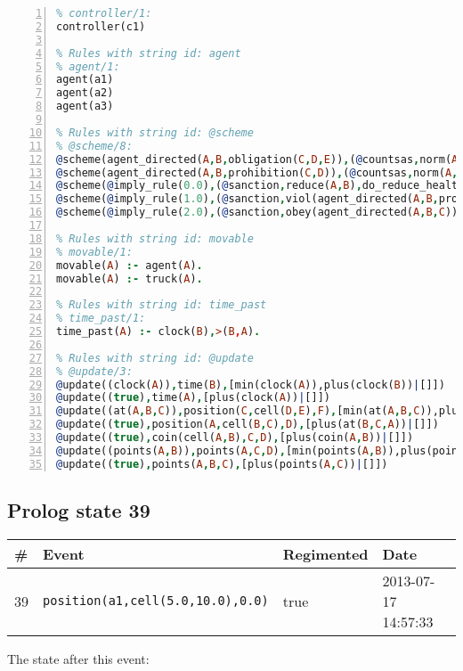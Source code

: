 \documentclass[11pt]{article}\usepackage[utf8]{inputenc}\usepackage{geometry}
\begin{document}
\begin{lstlisting}[language=Prolog, numbers=left]
% Rules with string id: controller
% controller/1:
controller(c1)

% Rules with string id: agent
% agent/1:
agent(a1)
agent(a2)
agent(a3)

% Rules with string id: @scheme
% @scheme/8:
@scheme(agent_directed(A,B,obligation(C,D,E)),(@countsas,norm(A,B,F,obligation(C,D,E)),F),false,(listTrue(C)),(time_past(D)),false,[plus(viol(agent_directed(A,B,obligation(C,D,E))))|[]],[plus(obey(agent_directed(A,B,obligation(C,D,E))))|[]])
@scheme(agent_directed(A,B,prohibition(C,D)),(@countsas,norm(A,B,E,prohibition(C,D)),E),(listTrue(C)),false,(false),false,[plus(viol(agent_directed(A,B,prohibition(C,D))))|[]],[plus(obey(agent_directed(A,B,prohibition(C,D))))|[]])
@scheme(@imply_rule(0.0),(@sanction,reduce(A,B),do_reduce_health(A,B),notifyAgent(A,changed(status))),true,false,false,false,[min(reduce(A,B))|[]],[])
@scheme(@imply_rule(1.0),(@sanction,viol(agent_directed(A,B,prohibition(C,D))),do_sanction(D)),true,false,false,false,[min(viol(agent_directed(A,B,prohibition(C,D))))|[]],[])
@scheme(@imply_rule(2.0),(@sanction,obey(agent_directed(A,B,C))),true,false,false,false,[min(obey(agent_directed(A,B,C)))|[]],[])

% Rules with string id: movable
% movable/1:
movable(A) :- agent(A).
movable(A) :- truck(A).

% Rules with string id: time_past
% time_past/1:
time_past(A) :- clock(B),>(B,A).

% Rules with string id: @update
% @update/3:
@update((clock(A)),time(B),[min(clock(A)),plus(clock(B))|[]])
@update((true),time(A),[plus(clock(A))|[]])
@update((at(A,B,C)),position(C,cell(D,E),F),[min(at(A,B,C)),plus(at(D,E,C))|[]])
@update((true),position(A,cell(B,C),D),[plus(at(B,C,A))|[]])
@update((true),coin(cell(A,B),C,D),[plus(coin(A,B))|[]])
@update((points(A,B)),points(A,C,D),[min(points(A,B)),plus(points(A,D))|[]])
@update((true),points(A,B,C),[plus(points(A,C))|[]])

\end{lstlisting}
\clearpage 
\subsection{Prolog state 39}
\begin{table}[ht]
\centering 
\begin{tabular}{l l l l} 
\textbf{\#} & \textbf{Event} & \textbf{Regimented} & \textbf{Date} \\ [0.5ex] 
\hline
39&\texttt{position(a1,cell(5.0,10.0),0.0)}&true&2013-07-17 14:57:33\\ [1ex] \hline\end{tabular}
\end{table}
The state after this event:
\end{document}
